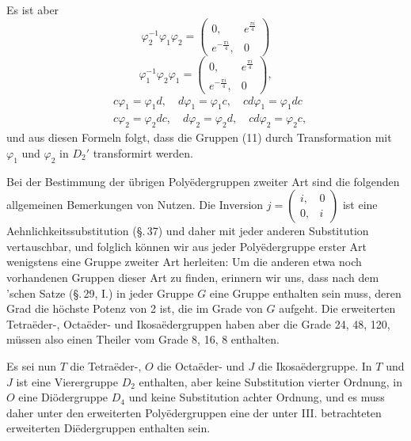 Es ist aber
\[
\varphi_2^{-1} \varphi_1 \varphi_2 = \begin{pmatrix} 0, & e^{\frac{\pi i}{4}} \\ e^{-\frac{\pi i}{4}}, & 0 \end{pmatrix}
\]
\[
\varphi_1^{-1} \varphi_2 \varphi_1 = \begin{pmatrix} 0, & e^{\frac{\pi i}{4}} \\ e^{-\frac{\pi i}{4}}, & 0 \end{pmatrix},
\]
\[
\begin{aligned}
&c\varphi_1 = \varphi_1 d,\quad d\varphi_1 = \varphi_1 c,\quad cd\varphi_1 = \varphi_1 dc\\
&c\varphi_2 = \varphi_2 dc,\quad d\varphi_2 = \varphi_2 d,\quad cd\varphi_2 = \varphi_2 c,
\end{aligned}
\]
und aus diesen Formeln folgt, dass die Gruppen (11) durch Transformation mit $\varphi_1$ und $\varphi_2$ in $D_2'$ transformirt werden.

Bei der Bestimmung der übrigen Poly\"edergruppen zweiter Art sind die folgenden allgemeinen Bemerkungen von Nutzen.
Die Inversion $j = \begin{pmatrix} i, & 0 \\ 0, & i \end{pmatrix}$ ist eine Aehnlichkeitssubstitution (\S.\,37) und daher mit jeder anderen Substitution vertauschbar, und folglich können wir aus jeder Poly\"edergruppe erster Art wenigstens eine Gruppe zweiter Art herleiten:
Um die anderen etwa noch vorhandenen Gruppen dieser Art zu finden, erinnern wir uns, dass nach dem 'schen Satze (\S.\,29, I.) in jeder Gruppe $G$ eine Gruppe enthalten sein muss, deren Grad die höchste Potenz von 2 ist, die im Grade von $G$ aufgeht. Die erweiterten Tetra\"eder-, Octa\"eder- und Ikosa\"edergruppen haben aber die Grade 24, 48, 120, müssen also einen Theiler vom Grade 8, 16, 8 enthalten.

Es sei nun $T$ die Tetra\"eder-, $O$ die Octa\"eder- und $J$ die Ikosa\"edergruppe. In $T$ und $J$ ist eine Vierergruppe $D_2$ enthalten, aber keine Substitution vierter Ordnung, in $O$ eine Di\"odergruppe $D_4$ und keine Substitution achter Ordnung, und es muss daher unter den erweiterten Poly\"edergruppen eine der unter III. betrachteten erweiterten Di\"edergruppen enthalten sein.

